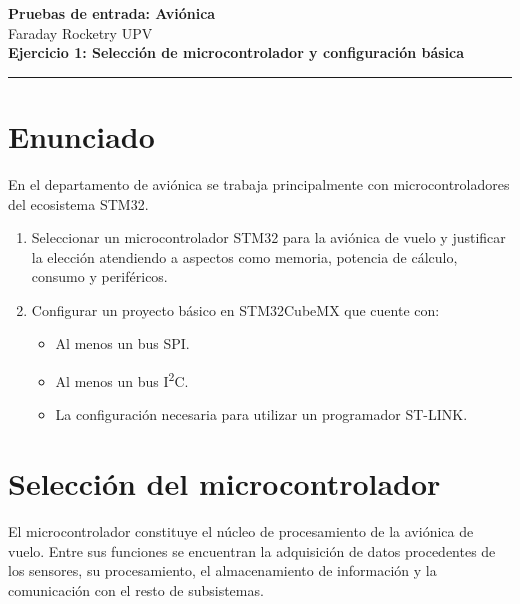 \documentclass[11pt,a4paper]{article}
\begin{document}
\begin{center}
    {\LARGE \textbf{Pruebas de entrada: Aviónica}}\\[0.4cm]
    {\large Faraday Rocketry UPV}\\[0.8cm]
    {\Large \textbf{Ejercicio 1: Selección de microcontrolador y configuración básica}}
\end{center}

\vspace{0.5cm}

\hrule
\vspace{0.5cm}

\section*{Enunciado}

En el departamento de aviónica se trabaja principalmente con
microcontroladores del ecosistema STM32.

\begin{enumerate}[label=\alph*.]

    \item Seleccionar un microcontrolador STM32 para la aviónica de vuelo
    y justificar la elección atendiendo a aspectos como memoria,
    potencia de cálculo, consumo y periféricos.

    \item Configurar un proyecto básico en STM32CubeMX que cuente con:
    \begin{itemize}
        \item Al menos un bus SPI\@.
        \item Al menos un bus I\textsuperscript{2}C.
        \item La configuración necesaria para utilizar un programador
        ST-LINK\@.
    \end{itemize}

\end{enumerate}

\section{Selección del microcontrolador}

El microcontrolador constituye el núcleo de procesamiento de la aviónica de vuelo. Entre sus funciones se encuentran la adquisición de datos procedentes de los sensores, su procesamiento, el almacenamiento de información y la comunicación con el resto de subsistemas.
\end{document}
